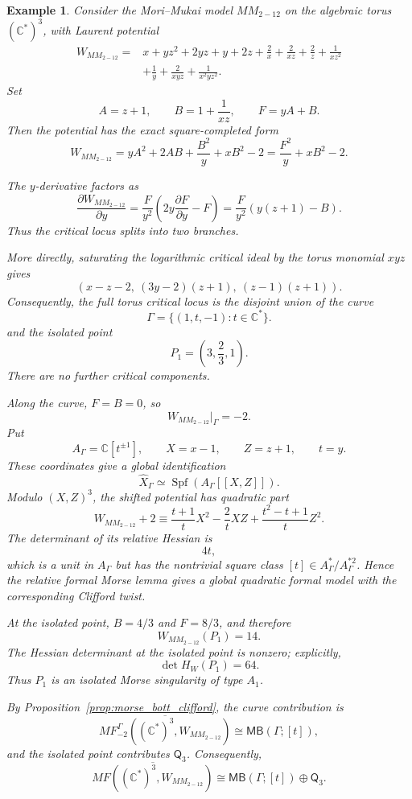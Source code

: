 \documentclass[11pt]{amsart}
\newtheorem{example}{Example}[section]
\newcommand{\MorseCat}[1]{\mathsf{Q}_{#1}}
\newcommand{\MBtwcat}[2]{\mathsf{MB}(#1;[#2])}
\begin{document}
\begin{example}
Consider the Mori--Mukai model $MM_{2-12}$ on the algebraic torus
$(\mathbb{C}^*)^3$, with Laurent potential
\begin{align*}
W_{MM_{2-12}}={}&x+yz^2+2yz+y+2z+\frac{2}{x}
+\frac{2}{xz}+\frac{2}{z}+\frac{1}{xz^2} \\
&+\frac{1}{y}+\frac{2}{xyz}+\frac{1}{x^2yz^2}.
\end{align*}
Set
\[
A=z+1,
\qquad
B=1+\frac{1}{xz},
\qquad
F=yA+B.
\]
Then the potential has the exact square-completed form
\[
W_{MM_{2-12}}
=yA^2+2AB+\frac{B^2}{y}+xB^2-2
=\frac{F^2}{y}+xB^2-2.
\]

The $y$-derivative factors as
\[
\frac{\partial W_{MM_{2-12}}}{\partial y}
=\frac{F}{y^2}\left(2y\frac{\partial F}{\partial y}-F\right)
=\frac{F}{y^2}\left(y(z+1)-B\right).
\]
Thus the critical locus splits into two branches.

More directly, saturating the logarithmic critical ideal by the torus monomial
$xyz$ gives
\[
\left(x-z-2,\ (3y-2)(z+1),\ (z-1)(z+1)\right).
\]
Consequently, the full torus critical locus is the disjoint union of the curve
\[
\Gamma=\{(1,t,-1):t\in\mathbb{C}^*\}.
\]
and the isolated point
\[
P_1=\left(3,\frac{2}{3},1\right).
\]
There are no further critical components.

Along the curve, $F=B=0$, so
\[
W_{MM_{2-12}}|_{\Gamma}=-2.
\]
Put
\[
A_{\Gamma}=\mathbb C[t^{\pm1}],
\qquad
X=x-1,
\qquad
Z=z+1,
\qquad
t=y.
\]
These coordinates give a global identification
\[
\widehat X_{\Gamma}\simeq\operatorname{Spf}(A_{\Gamma}[[X,Z]]).
\]
Modulo $(X,Z)^3$, the shifted potential has quadratic part
\[
W_{MM_{2-12}}+2\equiv
\frac{t+1}{t}X^2-\frac{2}{t}XZ+
\frac{t^2-t+1}{t}Z^2.
\]
The determinant of its relative Hessian is
\[
4t,
\]
which is a unit in $A_{\Gamma}$ but has the nontrivial square class
$[t]\in A_{\Gamma}^*/A_{\Gamma}^{*2}$. Hence the relative formal Morse lemma
gives a global quadratic formal model with the corresponding Clifford twist.

At the isolated point, $B=4/3$ and $F=8/3$, and therefore
\[
W_{MM_{2-12}}(P_1)=14.
\]
The Hessian determinant at the isolated point is nonzero; explicitly,
\[
\det H_W(P_1)=64.
\]
Thus $P_1$ is an isolated Morse singularity of type $A_1$.

By Proposition~\ref{prop:morse_bott_clifford}, the curve contribution is
\[
\overline{MF^{\Gamma}_{-2}((\mathbb{C}^*)^3,W_{MM_{2-12}})}
\cong \MBtwcat{\Gamma}{t},
\]
and the isolated point contributes $\MorseCat{3}$. Consequently,
\[
\overline{MF((\mathbb{C}^*)^3,W_{MM_{2-12}})}
\cong \MBtwcat{\Gamma}{t}\oplus \MorseCat{3}.
\]
\end{example}
\end{document}
